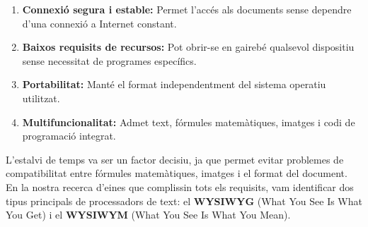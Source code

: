 \begin{enumerate}

\item \textbf{Connexió segura i estable: } Permet l’accés als documents sense dependre d’una connexió a Internet constant.

\item \textbf{Baixos requisits de recursos: } Pot obrir-se en gairebé qualsevol dispositiu sense necessitat de programes específics.

\item \textbf{Portabilitat: } Manté el format independentment del sistema operatiu utilitzat.

\item \textbf{Multifuncionalitat: } Admet text, fórmules matemàtiques, imatges i codi de programació integrat.

\end{enumerate}


L’estalvi de temps va ser un factor decisiu, ja que permet evitar problemes de compatibilitat entre fórmules matemàtiques, imatges i el format del document.
En la nostra recerca d’eines que complissin tots els requisits, vam identificar dos tipus principals de processadors de text: el \textbf{WYSIWYG} (What You See Is What You Get) i el \textbf{WYSIWYM} (What You See Is What You Mean).


